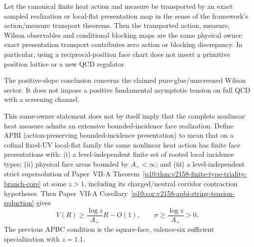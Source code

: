 \documentclass[12pt,a4paper]{article}
\begin{document}
\begin{theorem}
\label{p12:thm:v2155-same-owner-apbc-bridge}
\label{p12:thm:v2158-same-owner-apbi-bridge}
Let the canonical finite heat action and measure be transported by an exact
sampled realization or local-flat presentation map in the sense of the
framework's action/measure transport theorems.  Then the transported action,
measure, Wilson observables and conditional blocking maps are the same physical
owner: exact presentation transport contributes zero action or blocking
discrepancy.  In particular, using a reciprocal-position face chart does not
insert a primitive position lattice or a new QCD regulator.

The positive-slope conclusion concerns the claimed pure-glue/unscreened
Wilson sector.  It does not impose a positive fundamental asymptotic tension
on full QCD with a screening channel.

This same-owner statement does not by itself imply that the complete nonlinear
heat measure admits an extensive bounded-incidence face realization.  Define
APBI (action-preserving bounded-incidence presentation) to mean that on a
cofinal fixed-UV local-flat family the same nonlinear heat action has finite
face presentations with: (i) a level-independent finite set of rooted local
incidence types; (ii) physical face areas bounded by $A_+<\infty$; and (iii) a
level-independent strict supersolution of Paper~VII-A
Theorem~\ref{p10:thm:v2158-finite-type-triality-branch-core} at some $z>1$,
including its charged/neutral corridor contraction hypotheses.  Then
Paper~VII-A Corollary~\ref{p10:cor:v2158-apbi-string-tension-reduction} gives
\[
 V(R)\ge\frac{\log z}{A_+}R-O(1),
 \qquad
 \boxed{\sigma\ge\frac{\log z}{A_+}>0.}
\]
The previous APBC condition is the square-face, valence-six sufficient
specialization with $z=1.1$.
\end{theorem}
\end{document}
